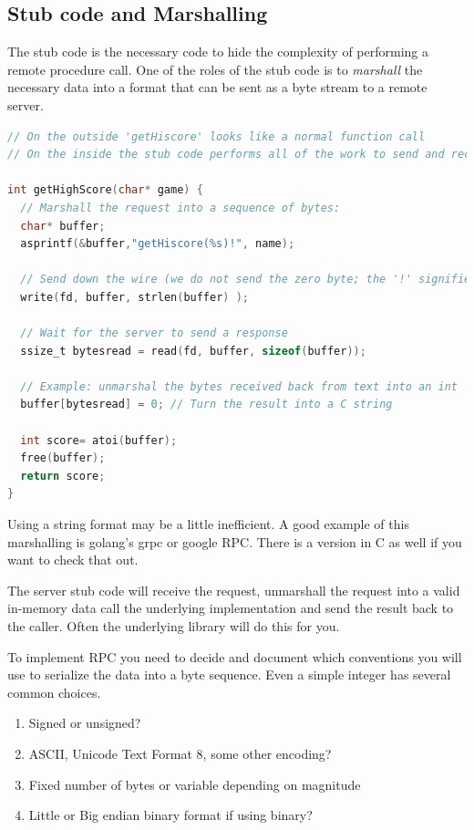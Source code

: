 \subsection{Stub code and Marshalling}

The stub code is the necessary code to hide the complexity of performing a remote procedure call.
One of the roles of the stub code is to \emph{marshall} the necessary data into a format that can be sent as a byte stream to a remote server.

\begin{lstlisting}[language=C]
// On the outside 'getHiscore' looks like a normal function call
// On the inside the stub code performs all of the work to send and receive the data to and from the remote machine.

int getHighScore(char* game) {
  // Marshall the request into a sequence of bytes:
  char* buffer;
  asprintf(&buffer,"getHiscore(%s)!", name);

  // Send down the wire (we do not send the zero byte; the '!' signifies the end of the message)
  write(fd, buffer, strlen(buffer) );

  // Wait for the server to send a response
  ssize_t bytesread = read(fd, buffer, sizeof(buffer));

  // Example: unmarshal the bytes received back from text into an int
  buffer[bytesread] = 0; // Turn the result into a C string

  int score= atoi(buffer);
  free(buffer);
  return score;
}
\end{lstlisting}

Using a string format may be a little inefficient.
A good example of this marshalling is golang's grpc or google RPC. There is a version in C as well if you want to check that out.

The server stub code will receive the request, unmarshall the request into a valid in-memory data call the underlying implementation and send the result back to the caller.
Often the underlying library will do this for you.

To implement RPC you need to decide and document which conventions you will use to serialize the data into a byte sequence.
Even a simple integer has several common choices.

\begin{enumerate}
\item Signed or unsigned?
\item ASCII, Unicode Text Format 8, some other encoding?
\item Fixed number of bytes or variable depending on magnitude
\item Little or Big endian binary format if using binary?
\end{enumerate}

